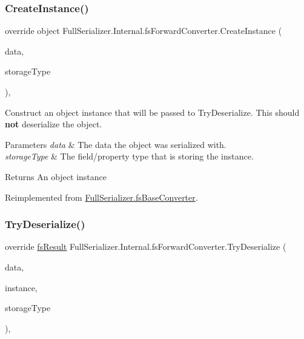 \subsubsection{\texorpdfstring{Create\+Instance()}{CreateInstance()}}
{\footnotesize\ttfamily override object Full\+Serializer.\+Internal.\+fs\+Forward\+Converter.\+Create\+Instance (\begin{DoxyParamCaption}\item[{\hyperlink{class_full_serializer_1_1fs_data}{fs\+Data}}]{data,  }\item[{Type}]{storage\+Type }\end{DoxyParamCaption})\hspace{0.3cm}{\ttfamily [inline]}, {\ttfamily [virtual]}}



Construct an object instance that will be passed to Try\+Deserialize. This should {\bfseries not} deserialize the object. 


\begin{DoxyParams}{Parameters}
{\em data} & The data the object was serialized with.\\
\hline
{\em storage\+Type} & The field/property type that is storing the instance.\\
\hline
\end{DoxyParams}
\begin{DoxyReturn}{Returns}
An object instance
\end{DoxyReturn}


Reimplemented from \hyperlink{class_full_serializer_1_1fs_base_converter_a415ea2ac9429bbb9927346af7cb7c2e1}{Full\+Serializer.\+fs\+Base\+Converter}.

\mbox{\label{class_full_serializer_1_1_internal_1_1fs_forward_converter_a81d2d460112d57d67e8156cd5a52e1e1}} 
\subsubsection{\texorpdfstring{Try\+Deserialize()}{TryDeserialize()}}
{\footnotesize\ttfamily override \hyperlink{struct_full_serializer_1_1fs_result}{fs\+Result} Full\+Serializer.\+Internal.\+fs\+Forward\+Converter.\+Try\+Deserialize (\begin{DoxyParamCaption}\item[{\hyperlink{class_full_serializer_1_1fs_data}{fs\+Data}}]{data,  }\item[{ref object}]{instance,  }\item[{Type}]{storage\+Type }\end{DoxyParamCaption})\hspace{0.3cm}{\ttfamily [inline]}, {\ttfamily [virtual]}}



